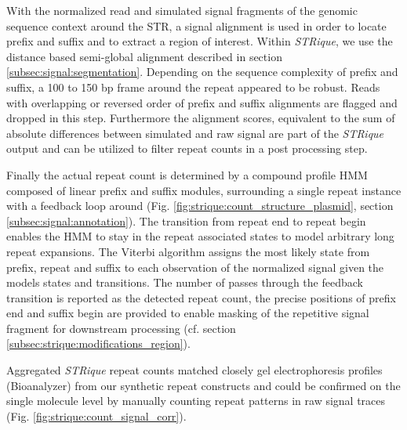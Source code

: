 With the normalized read and simulated signal fragments of the genomic sequence context around the STR, a signal alignment is used in order to locate prefix and suffix and to extract a region of interest. Within \textit{STRique}, we use the distance based semi-global alignment described in section \ref{subsec:signal:segmentation}. Depending on the sequence complexity of prefix and suffix, a 100 to 150 bp frame around the repeat appeared to be robust. Reads with overlapping or reversed order of prefix and suffix alignments are flagged and dropped in this step. Furthermore the alignment scores, equivalent to the sum of absolute differences between simulated and raw signal are part of the \textit{STRique} output and can be utilized to filter repeat counts in a post processing step.

Finally the actual repeat count is determined by a compound profile HMM composed of linear prefix and suffix modules, surrounding a single repeat instance with a feedback loop around (Fig. \ref{fig:strique:count_structure_plasmid}, section \ref{subsec:signal:annotation}). The transition from repeat end to repeat begin enables the HMM to stay in the repeat associated states to model arbitrary long repeat expansions. The Viterbi algorithm assigns the most likely state from prefix, repeat and suffix to each observation of the normalized signal given the models states and transitions. The number of passes through the feedback transition is reported as the detected repeat count, the precise positions of prefix end and suffix begin are provided to enable masking of the repetitive signal fragment for downstream processing (cf. section \ref{subsec:strique:modifications_region}).

Aggregated \textit{STRique} repeat counts matched closely gel electrophoresis profiles (Bioanalyzer) from our synthetic repeat constructs and could be confirmed on the single molecule level by manually counting repeat patterns in raw signal traces (Fig. \ref{fig:strique:count_signal_corr}).

